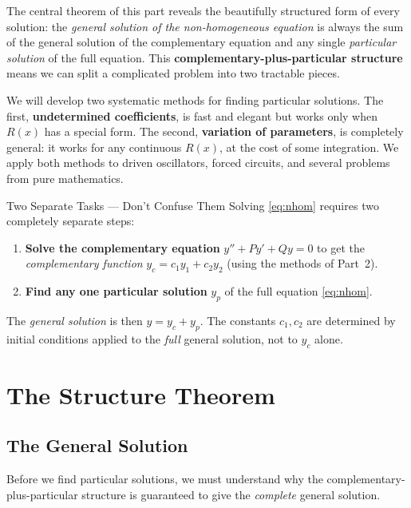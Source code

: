 \documentclass[12pt,a4paper]{article}
\begin{document}
The central theorem of this part reveals the beautifully structured form of every
solution: the \emph{general solution of the non-homogeneous equation} is always the
sum of the general solution of the complementary equation and any single
\emph{particular solution} of the full equation. This \textbf{complementary-plus-particular
structure} means we can split a complicated problem into two tractable pieces.

We will develop two systematic methods for finding particular solutions. The first,
\textbf{undetermined coefficients}, is fast and elegant but works only when $R(x)$ has
a special form. The second, \textbf{variation of parameters}, is completely general: it
works for any continuous $R(x)$, at the cost of some integration. We apply both
methods to driven oscillators, forced circuits, and several problems from pure
mathematics.

\begin{warningbox}{Two Separate Tasks --- Don't Confuse Them}
Solving \eqref{eq:nhom} requires two completely separate steps:
\begin{enumerate}[nosep]
  \item \textbf{Solve the complementary equation} $y'' + Py' + Qy = 0$
        to get the \emph{complementary function} $y_c = c_1 y_1 + c_2 y_2$
        (using the methods of Part~2).
  \item \textbf{Find any one particular solution} $y_p$ of the full
        equation \eqref{eq:nhom}.
\end{enumerate}
The \emph{general solution} is then $y = y_c + y_p$. The constants $c_1, c_2$
are determined by initial conditions applied to the \emph{full} general solution,
not to $y_c$ alone.
\end{warningbox}

\section{The Structure Theorem}

\subsection{The General Solution}

Before we find particular solutions, we must understand why the complementary-plus-particular
structure is guaranteed to give the \emph{complete} general solution.
\end{document}
